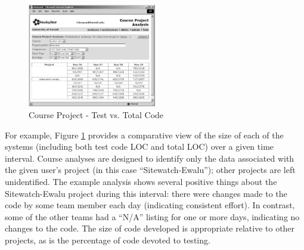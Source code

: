 
\begin{figure}[ht]
  \centering
  \includegraphics[width=0.5\textwidth]{course-project-analysis-loc-2.eps}
  \caption{Course Project - Test vs. Total Code}
  \label{fig:course-project-analysis-loc}
\end{figure}


For example, Figure \ref{fig:course-project-analysis-loc} provides a
comparative view of the size of each of the systems (including both test
code LOC and total LOC) over a given time interval.  Course analyses are
designed to identify only the data associated with the given user's project
(in this case ``Sitewatch-Ewalu''); other projects are left unidentified. 
The example analysis shows several positive things about the
Sitewatch-Ewalu project during this interval: there were changes made to
the code by some team member each day (indicating consistent
effort). In contrast, some of the other teams had a ``N/A'' listing for one
or more days, indicating no changes to the code.  The size of code
developed is appropriate relative to other projects, as is the percentage
of code devoted to testing. 

